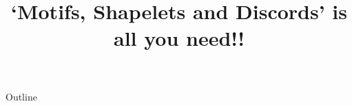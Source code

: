 \documentclass[xcolor=dvipsnames,compress,t,pdf,9pt]{beamer}
\title[\insertframenumber /\inserttotalframenumber]{`Motifs, Shapelets and Discords' is all you need!!}
\begin{document}
	\begin{frame}
	\titlepage
	\end{frame}
	
	\begin{frame}{Outline}
	    \tableofcontents
	\end{frame}

	
	
    
	
	
\end{document}
